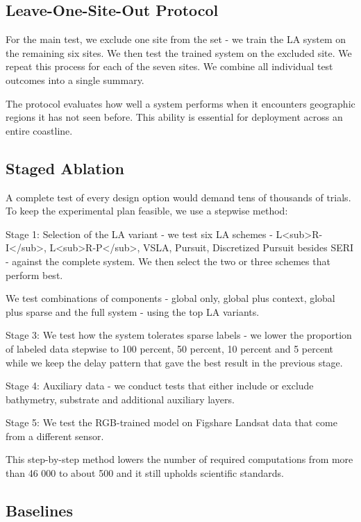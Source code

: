 \documentclass[11pt,a4paper]{article}
\begin{document}
\begin{itemize}
\subsection{Leave-One-Site-Out Protocol}

For the main test, we exclude one site from the set - we train the LA system on the remaining six sites. We then test the trained system on the excluded site. We repeat this process for each of the seven sites. We combine all individual test outcomes into a single summary.

The protocol evaluates how well a system performs when it encounters geographic regions it has not seen before. This ability is essential for deployment across an entire coastline.

\subsection{Staged Ablation}

A complete test of every design option would demand tens of thousands of trials. To keep the experimental plan feasible, we use a stepwise method:

Stage 1: Selection of the LA variant - we test six LA schemes - L<sub>R-I</sub>, L<sub>R-P</sub>, VSLA, Pursuit, Discretized Pursuit besides SERI - against the complete system. We then select the two or three schemes that perform best.

We test combinations of components - global only, global plus context, global plus sparse and the full system - using the top LA variants.

Stage 3: We test how the system tolerates sparse labels - we lower the proportion of labeled data stepwise to 100 percent, 50 percent, 10 percent and 5 percent while we keep the delay pattern that gave the best result in the previous stage.

Stage 4: Auxiliary data - we conduct tests that either include or exclude bathymetry, substrate and additional auxiliary layers.

Stage 5: We test the RGB-trained model on Figshare Landsat data that come from a different sensor.

This step-by-step method lowers the number of required computations from more than 46 000 to about 500 and it still upholds scientific standards.

\subsection{Baselines}


\end{itemize}
\end{document}
